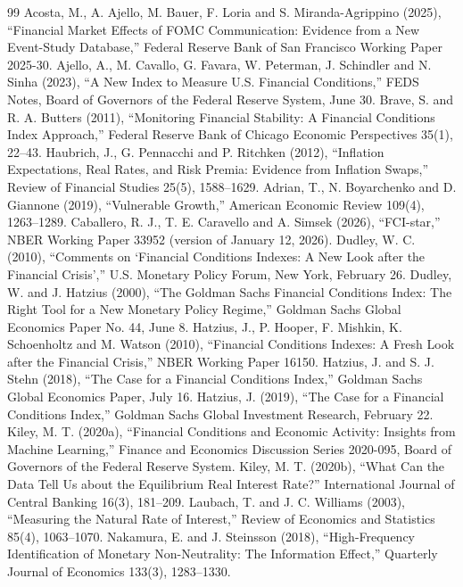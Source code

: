 \documentclass[11pt]{article}
\begin{document}
\begin{thebibliography}{99}\small
{} Acosta, M., A. Ajello, M. Bauer, F. Loria and S. Miranda-Agrippino (2025), ``Financial Market Effects of FOMC Communication: Evidence from a New Event-Study Database,'' Federal Reserve Bank of San Francisco Working Paper 2025-30.
 Ajello, A., M. Cavallo, G. Favara, W. Peterman, J. Schindler and N. Sinha (2023), ``A New Index to Measure U.S. Financial Conditions,'' FEDS Notes, Board of Governors of the Federal Reserve System, June 30.
 Brave, S. and R. A. Butters (2011), ``Monitoring Financial Stability: A Financial Conditions Index Approach,'' Federal Reserve Bank of Chicago Economic Perspectives 35(1), 22--43.
 Haubrich, J., G. Pennacchi and P. Ritchken (2012), ``Inflation Expectations, Real Rates, and Risk Premia: Evidence from Inflation Swaps,'' Review of Financial Studies 25(5), 1588--1629.
 Adrian, T., N. Boyarchenko and D. Giannone (2019), ``Vulnerable Growth,'' American Economic Review 109(4), 1263--1289.
 Caballero, R. J., T. E. Caravello and A. Simsek (2026), ``FCI-star,'' NBER Working Paper 33952 (version of January 12, 2026).
 Dudley, W. C. (2010), ``Comments on `Financial Conditions Indexes: A New Look after the Financial Crisis','' U.S. Monetary Policy Forum, New York, February 26.
 Dudley, W. and J. Hatzius (2000), ``The Goldman Sachs Financial Conditions Index: The Right Tool for a New Monetary Policy Regime,'' Goldman Sachs Global Economics Paper No. 44, June 8.
 Hatzius, J., P. Hooper, F. Mishkin, K. Schoenholtz and M. Watson (2010), ``Financial Conditions Indexes: A Fresh Look after the Financial Crisis,'' NBER Working Paper 16150.
 Hatzius, J. and S. J. Stehn (2018), ``The Case for a Financial Conditions Index,'' Goldman Sachs Global Economics Paper, July 16.
 Hatzius, J. (2019), ``The Case for a Financial Conditions Index,'' Goldman Sachs Global Investment Research, February 22.
 Kiley, M. T. (2020a), ``Financial Conditions and Economic Activity: Insights from Machine Learning,'' Finance and Economics Discussion Series 2020-095, Board of Governors of the Federal Reserve System.
 Kiley, M. T. (2020b), ``What Can the Data Tell Us about the Equilibrium Real Interest Rate?'' International Journal of Central Banking 16(3), 181--209.
 Laubach, T. and J. C. Williams (2003), ``Measuring the Natural Rate of Interest,'' Review of Economics and Statistics 85(4), 1063--1070.
 Nakamura, E. and J. Steinsson (2018), ``High-Frequency Identification of Monetary Non-Neutrality: The Information Effect,'' Quarterly Journal of Economics 133(3), 1283--1330.
\end{thebibliography}
\end{document}
